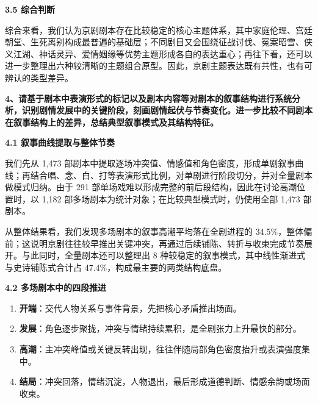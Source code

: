 \documentclass[12pt, a4paper]{article}
\begin{document}
{\fontsize{13bp}{18bp}\heiti\bfseries 3.5 综合判断}


{\fontsize{12bp}{20bp}\kaishu
综合来看，我们认为京剧剧本存在比较稳定的核心主题体系，其中家庭伦理、宫廷朝堂、生死离别构成最普遍的基础层；不同剧目又会围绕征战讨伐、冤案昭雪、侠义江湖、神话灵异、爱情姻缘等优势主题形成各自的表达重心；再往下看，还可以进一步整理出六种较清晰的主题组合原型。因此，京剧主题表达既有共性，也有可辨认的类型差异。
}



{\fontsize{13bp}{20bp}\heiti\bfseries
4、请基于剧本中表演形式的标记以及剧本内容等对剧本的叙事结构进行系统分析，识别剧情发展中的关键阶段，刻画剧情起伏与节奏变化。进一步比较不同剧本在叙事结构上的差异，总结典型叙事模式及其结构特征。
}

\vspace{6pt}

{\fontsize{13bp}{18bp}\heiti\bfseries 4.1 叙事曲线提取与整体节奏}

\vspace{4pt}

{\fontsize{12bp}{20bp}\kaishu
我们先从 1{,}473 部剧本中提取逐场冲突值、情感值和角色密度，形成单剧叙事曲线；再结合唱、念、白、打等表演形式比例，对单剧进行阶段切分，并对全量剧本做模式归纳。由于 291 部单场戏难以形成完整的前后段结构，因此在讨论高潮位置时，以 1{,}182 部多场剧本为统计对象；在比较典型模式时，仍使用全部 1{,}473 部剧本。
}

{\fontsize{12bp}{20bp}\kaishu
从整体结果看，我们发现多场剧本的叙事高潮平均落在全剧进程的 34.5\%，整体偏前；这说明京剧往往较早推出关键冲突，再通过后续铺陈、转折与收束完成节奏展开。与此同时，全量剧本还可以整理出 8 种较稳定的叙事模式，其中线性渐进式与史诗铺陈式合计占 47.4\%，构成最主要的两类结构底盘。
}

\vspace{6pt}

{\fontsize{13bp}{18bp}\heiti\bfseries 4.2 多场剧本中的四段推进}

\vspace{4pt}
{\fontsize{12bp}{20bp}\kaishu
\begin{enumerate}[leftmargin=2.2em,itemsep=2pt,topsep=2pt]
\item \textbf{开端}：交代人物关系与事件背景，先把核心矛盾推出场面。
\item \textbf{发展}：角色逐步聚拢，冲突与情绪持续累积，是全剧张力上升最快的部分。
\item \textbf{高潮}：主冲突峰值或关键反转出现，往往伴随局部角色密度抬升或表演强度集中。
\item \textbf{结局}：冲突回落，情绪沉淀，人物退出，最后形成道德判断、情感余韵或场面收束。
\end{enumerate}
}
\end{document}
